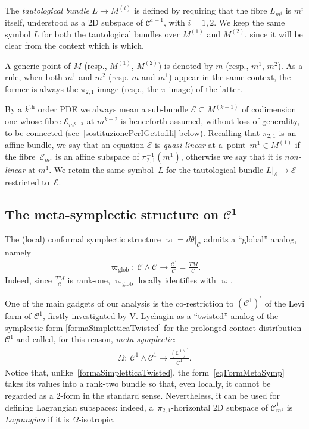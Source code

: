 \documentclass[pdftex]{sigma}
\newcommand{\C}{\mathcal{C}}
\newcommand{\E}{\mathcal{E}}
\newcommand{\Th}{^\textrm{th}}
\numberwithin{equation}{section}
\begin{document}
The \emph{tautological bundle} $L\rightarrow M^{(i)}$
is def\/ined by requiring that the f\/ibre $L_{m^i}$ is $m^i$ itself, understood as a 2D subspace of $\C^{i-1}$, with $i=1,2$. We keep the same symbol $L$ for both the tautological bundles over $M^{(1)}$ and $M^{(2)}$, since it will be clear from the context which is which.

A generic point of $M$ (resp., $M ^{(1)}$, $M ^{(2)}$) is denoted by $m$ (resp., $m^1$, $m^2$). As a rule, when both $m^1$ and $m^2$ (resp. $m$ and $m^1$) appear in the same context, the former is always the $\pi_{2,1}$-image (resp., the $\pi$-image) of the latter.

By a $k\Th$ order PDE we always mean a sub-bundle $\E\subseteq M^{(k-1)}$ of codimension one whose f\/ibre $\E_{m^{k-2}}$ at $m^{k-2}$ is henceforth assumed, without loss of generality, to be connected (see~\eqref{sostituzionePerIGettofili} below). Recalling that $\pi_{2,1}$ is an af\/f\/ine bundle, we say that an equation $\E$ is \emph{quasi-linear} at a~point~$m^1\in M^{(1)}$ if the f\/ibre~$\E_{m^1}$ is an af\/f\/ine subspace of $\pi_{2,1}^{-1}(m^1)$, otherwise we say that it is \emph{non-linear} at $m^1$.
We retain the same symbol~$L$ for the tautological bundle $L|_\E\longrightarrow \E$ restricted to~$\E$.

\subsection[The meta-symplectic structure on $\C^1$]{The meta-symplectic structure on $\boldsymbol{\C^1}$}\label{subMetaSim}

The (local) conformal symplectic structure $\varpi=d\theta|_{\C}$ admits a ``global'' analog, namely
\begin{gather}\label{formaSimpletticaTwisted}
\varpi_{\textrm{glob}}\colon \ \C\wedge\C\longrightarrow \frac{\C^\prime}{\C}=\frac{TM}{\C}.
\end{gather}
Indeed,
since
$\frac{TM}{\C} $ is rank-one, $\varpi_{\textrm{glob}}$ locally identif\/ies with $\varpi$.

One of the main gadgets of our analysis is the co-restriction to $(\C^{1})^\prime$ of the Levi form of $\C^1$, f\/irstly investigated by V. Lychagin \cite{MR2389645} as a ``twisted'' analog of the symplectic form \eqref{formaSimpletticaTwisted} for the prolonged contact distribution $\C^1$ and called, for this reason, \emph{meta-symplectic}:
\begin{gather}\label{eqFormMetaSymp}
\Omega\colon \ \C^{1}\wedge\C^{1}\longrightarrow \frac{(\C^{1})^\prime}{\C^{1}}.
\end{gather}
Notice that,
unlike~\eqref{formaSimpletticaTwisted}, the form~\eqref{eqFormMetaSymp} takes its values into a rank-two bundle so that, even locally, it cannot be regarded as a 2-form in the standard sense. Nevertheless, it can be used for def\/ining Lagrangian subspaces: indeed, a~$\pi_{2,1}$-horizontal 2D subspace of $\C_{m^1}^1$ is \emph{Lagrangian} if it is $\Omega$-isotropic.
\end{document}
